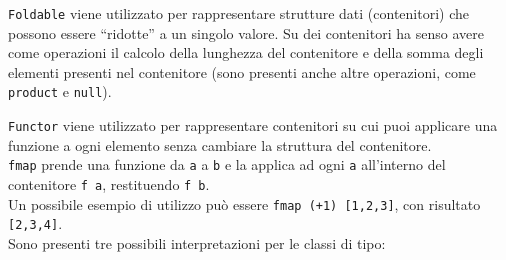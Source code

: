 \documentclass{article}
\begin{document}
\texttt{Foldable} viene utilizzato per rappresentare strutture dati (contenitori) che possono essere “ridotte” a un singolo valore. Su dei contenitori ha senso avere come operazioni il calcolo della lunghezza del contenitore e della somma degli elementi presenti nel contenitore (sono presenti anche altre operazioni, come \texttt{product} e \texttt{null}).

\texttt{Functor} viene utilizzato per rappresentare contenitori su cui puoi applicare una funzione a ogni elemento senza cambiare la struttura del contenitore.\\
\texttt{fmap} prende una funzione da \texttt{a} a \texttt{b} e la applica ad ogni \texttt{a} all'interno del contenitore \texttt{f a}, restituendo \texttt{f b}.\\
Un possibile esempio di utilizzo può essere \texttt{fmap (+1) [1,2,3]}, con risultato \texttt{[2,3,4]}.\vspace{14pt}\\
Sono presenti tre possibili interpretazioni per le classi di tipo:
\end{document}
